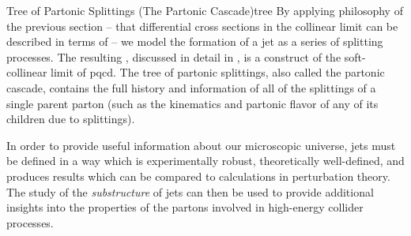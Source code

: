 \begin{definitionbox}{Tree of Partonic Splittings (The Partonic Cascade)}{tree}
    By applying philosophy of the previous section -- that differential cross sections in the collinear limit can be described in terms of  -- we model the formation of a jet as a series of splitting processes.
    The resulting , discussed in detail in , is a construct of the soft-collinear limit of \gls{pqcd}.
    The tree of partonic splittings, also called the partonic cascade, contains the full history and information of all of the splittings of a single parent parton (such as the kinematics and partonic flavor of any of its children due to splittings).
\end{definitionbox}


In order to provide useful information about our microscopic universe, jets must be defined in a way which is experimentally robust, theoretically well-defined, and produces results which can be compared to calculations in perturbation theory.
%
The study of the \textit{substructure} of jets can then be used to provide additional insights into the properties of the partons involved in high-energy collider processes.


